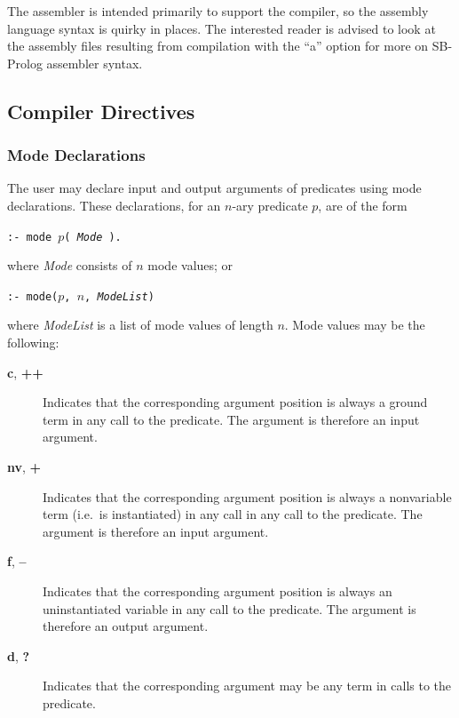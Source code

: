 The assembler is intended primarily to support the compiler,
so the assembly language syntax is quirky in places.
The interested reader is advised to look at the assembly files resulting
from compilation with the ``a'' option for more on SB-Prolog assembler syntax.

\subsection{Compiler Directives}

\subsubsection{Mode Declarations}

The user may declare input and output arguments of predicates
using mode declarations.
These declarations, for an $n$-ary predicate $p$, are of the form
\begin{center}
{\tt :- mode $p$( {\em Mode} ).}
\end{center}
where {\em Mode} consists of $n$ mode values; or
\begin{center}
{\tt :- mode($p$, $n$, {\em ModeList})}
\end{center}
where {\em ModeList} is a list of mode values of length $n$.
Mode values may be the following:
\begin{description}
\item[{\bf c}, {\bf ++}]
Indicates that the corresponding argument position is always a ground term
in any call to the predicate.
The argument is therefore an input argument.

\item[{\bf nv}, {\bf +}]
Indicates that the corresponding argument position is always a nonvariable
term (i.e.\ is instantiated) in any call in any call to the predicate.
The argument is therefore an input argument.

\item[{\bf f}, {\bf --}]
Indicates that the corresponding argument position is always an
uninstantiated variable in any call to the predicate.
The argument is therefore an output argument.

\item[{\bf d}, {\bf ?}]
Indicates that the corresponding argument may be any term in calls to the
predicate.
\end{description}


